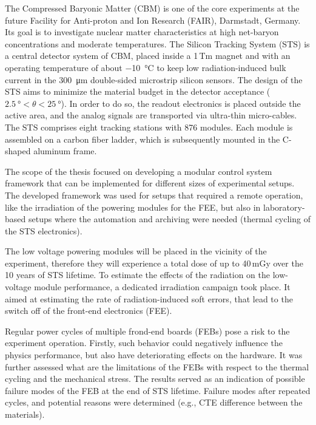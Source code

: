 The Compressed Baryonic Matter (CBM) is one of the core experiments at the future Facility for Anti-proton and Ion Research (FAIR), Darmstadt, Germany. Its goal is to investigate nuclear matter characteristics at high net-baryon concentrations and moderate temperatures. The Silicon Tracking System (STS) is a central detector system of CBM, placed inside a 1\,Tm magnet and with an operating temperature of about \SI{-10}{\celsius} to keep low radiation-induced bulk current in the \SI{300}{\micro\metre} double-sided microstrip silicon sensors. The design of the STS aims to minimize the material budget in the detector acceptance ($\SI{2.5}{\degree} < \theta < \SI{25}{\degree}$). In order to do so, the readout electronics is placed outside the active area, and the analog signals are transported via ultra-thin micro-cables. The STS comprises eight tracking stations with 876 modules. Each module is assembled on a carbon fiber ladder, which is subsequently mounted in the C-shaped aluminum frame. 

The scope of the thesis focused on developing a modular control system framework that can be implemented for different sizes of experimental setups. The developed framework was used for setups that required a remote operation, like the irradiation of the powering modules for the \gls{FEE}, but also in laboratory-based setups where the automation and archiving were needed (thermal cycling of the \gls{STS} electronics).

The low voltage powering modules will be placed in the vicinity of the experiment, therefore they will experience a total dose of up to 40\,mGy over the 10 years of \gls{STS} lifetime. To estimate the effects of the radiation on the low-voltage module performance, a dedicated irradiation campaign took place. It aimed at estimating the rate of radiation-induced soft errors, that lead to the switch off of the front-end electronics (\gls{FEE}).

Regular power cycles of multiple frond-end boards (\glspl{FEB}) pose a risk to the experiment operation.  Firstly, such behavior could negatively influence the physics performance, but also have deteriorating effects on the hardware. It was further assessed what are the limitations of the \glspl{FEB} with respect to the thermal cycling and the mechanical stress. The results served as an indication of possible failure modes of the \gls{FEB} at the end of \gls{STS} lifetime. Failure modes after repeated cycles, and potential reasons were determined (e.g., \gls{CTE} difference between the materials). 

